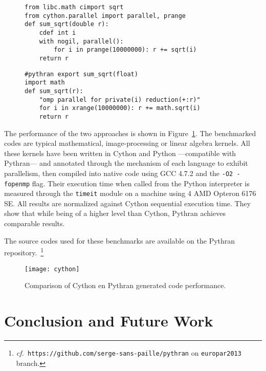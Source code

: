 \documentclass{llncs}
\newcommand\see{\emph{cf.\ }}
\begin{document}
\begin{figure}

    \begin{lstlisting}[label={lst:cython-sample}, caption={Cython implementation
    of a parallel reduction.}]
from libc.math cimport sqrt
from cython.parallel import parallel, prange
def sum_sqrt(double r):
    cdef int i
    with nogil, parallel():
        for i in prange(10000000): r += sqrt(i)
    return r
    \end{lstlisting}
%
    \begin{lstlisting}[label={lst:pythran-sample}, caption={Cython implementation
    of a parallel reduction.}]
#pythran export sum_sqrt(float)
import math
def sum_sqrt(r):
    "omp parallel for private(i) reduction(+:r)"
    for i in xrange(10000000): r += math.sqrt(i)
    return r
    \end{lstlisting}
\end{figure}



The performance of the two approaches is shown in
Figure~\ref{fig:cython-pythran}.  The benchmarked codes are typical
mathematical, image-processing or linear algebra kernels. All these kernels
have been written in Cython and Python ---compatible with Pythran--- and
annotated through the mechanism of each language to exhibit parallelism, then
compiled into native code using GCC 4.7.2 and the \texttt{-O2 -fopenmp} flag.
Their execution time when called from the Python interpreter is measured
through the \texttt{timeit} module on a machine using 4 AMD Opteron 6176 SE.
All results are normalized against Cython sequential execution time. They show
that while being of a higher level than Cython, Pythran achieves comparable
results.

The source codes used for these benchmarks are available on the Pythran
repository.~\footnote{\see \texttt{https://github.com/serge-sans-paille/pythran} on \texttt{europar2013}
branch.} 

\begin{figure}[ht]
    \texttt{[image: cython]}
    \caption{Comparison of Cython en Pythran generated code performance.}
    \label{fig:cython-pythran}
\end{figure}




\section{Conclusion and Future Work}
\end{document}
